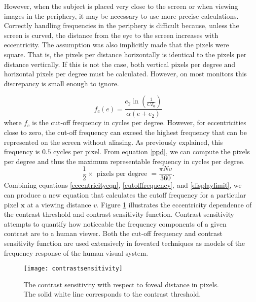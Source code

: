 \documentclass{article}
\begin{document}
However, when the subject is placed very close to the screen or when viewing images in the periphery, it may be necessary to use more precise calculations.
Correctly handling frequencies in the periphery is difficult because, unless the screen is curved, the distance from the eye to the screen increases with eccentricity.
The assumption was also implicitly made that the pixels were square.
That is, the pixels per distance horizontally is identical to the pixels per distance vertically.
If this is not the case, both vertical pixels per degree and horizontal pixels per degree must be calculated.
However, on most monitors this discrepancy is small enough to ignore.

\begin{equation}
\label{cutofffrequency}
f_c(e) = \frac{ e_2 \ln \left( \frac{1}{CT_0} \right) }{ \alpha (e + e_2) }
\end{equation}
where $f_c$ is the cut-off frequency in cycles per degree.
However, for eccentricities close to zero, the cut-off frequency can exceed the highest frequency that can be represented on the screen without aliasing.
As previously explained, this frequency is $0.5$ cycles per pixel. 
From equation \ref{ppd}, we can compute the pixels per degree and thus the maximum representable frequency in cycles per degree.
\begin{equation}
\label{displaylimit}
\frac{1}{2} \times \mbox{ pixels per degree }= \frac{\pi N v}{360}.
\end{equation}
Combining equations \ref{eccentricityeqn}, \ref{cutofffrequency}, and \ref{displaylimit}, we can produce a new equation that calculates the cutoff frequency for a particular pixel $\mathbf{x}$ at a viewing distance $v$.
Figure \ref{contrastsensitivity} illustrates the eccentricity dependence of the contrast threshold and contrast sensitivity function.
Contrast sensitivity attempts to quantify how noticeable the frequency components of a given contrast are to a human viewer.
Both the cut-off frequency and contrast sensitivity function are used extensively in foveated techniques as models of the frequency response of the human visual system.
\begin{figure}[!htbp]
\centering
\texttt{[image: contrastsensitivity]}
\caption{The contrast sensitivity with respect to foveal distance in pixels. The solid white line corresponds to the contrast threshold.}
\label{contrastsensitivity}
\end{figure}
\end{document}
